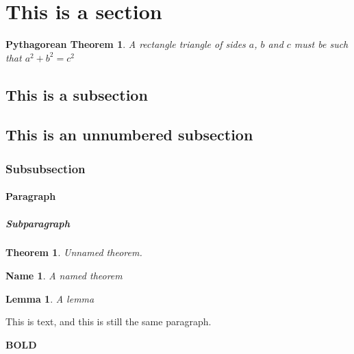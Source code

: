 \documentclass{article}
\title{}
\author{Miguel Murça}
\date{November 10, 2016}
\newtheorem{theorem0}{Pythagorean Theorem}
\newtheorem{theorem1}{Theorem}
\newtheorem{theorem2}{Name}
\newtheorem{theorem3}{Lemma}
\begin{document}
\maketitle

\vspace{5mm}


\vspace{5mm}


\vspace{5mm}

\section{This is a section}

\begin{theorem0}
    A rectangle triangle of sides $a$, $b$ and $c$ must be
    such that
    $a^2 + b^2 = c^2$
\end{theorem0}

\subsection{This is a subsection}

\subsection*{This is an unnumbered subsection}

\subsubsection{Subsubsection}

\paragraph{Paragraph}

\subparagraph{Subparagraph}

\begin{theorem1}
    Unnamed theorem.
\end{theorem1}

\begin{theorem2}
    A named theorem
\end{theorem2}

\begin{theorem3}
    A lemma
\end{theorem3}

This is text,
and this is still the same paragraph.

\textbf{BOLD}
\end{document}
